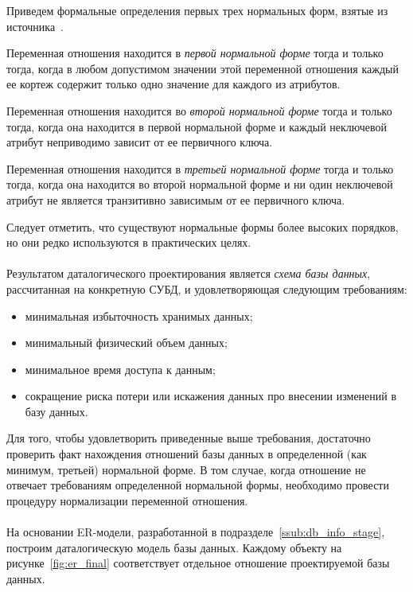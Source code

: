 Приведем формальные определения первых трех нормальных форм, 
взятые из источника~\cite{date05}. 

Переменная отношения находится в \textit{первой нормальной форме} тогда
и только тогда, когда в любом допустимом значении этой переменной отношения каждый
ее кортеж содержит только одно значение для каждого из атрибутов.

Переменная отношения находится во \textit{второй нормальной форме} тогда и только тогда,
когда она находится в первой нормальной форме и каждый неключевой атрибут
неприводимо зависит от ее первичного ключа.

Переменная отношения находится в \textit{третьей нормальной форме} тогда и только тогда,
когда она находится во второй нормальной форме и ни один неключевой атрибут не является
транзитивно зависимым от ее первичного ключа.

Следует отметить, что существуют нормальные формы более высоких порядков,
но они редко используются в практических целях.  

\paragraph{}
Результатом даталогического проектирования является \textit{схема базы данных},
рассчитанная на конкретную СУБД, и удовлетворяющая следующим требованиям:
\begin{itemize}
  \item минимальная избыточность хранимых данных;
  \item минимальный физический объем данных;
  \item минимальное время доступа к данным;
  \item сокращение риска потери или искажения данных про внесении изменений
    в базу данных.
\end{itemize}

Для того, чтобы удовлетворить приведенные выше требования, достаточно проверить факт
нахождения отношений базы данных в определенной (как минимум, третьей) нормальной форме.
В том случае, когда отношение не отвечает требованиям определенной нормальной формы,
необходимо провести процедуру нормализации переменной отношения.

\paragraph{}
На основании ER-модели, разработанной в подразделе~\ref{ssub:db_info_stage}, 
построим даталогическую модель базы данных.
Каждому объекту на рисунке~\ref{fig:er_final} соответствует отдельное отношение
проектируемой базы данных. 

